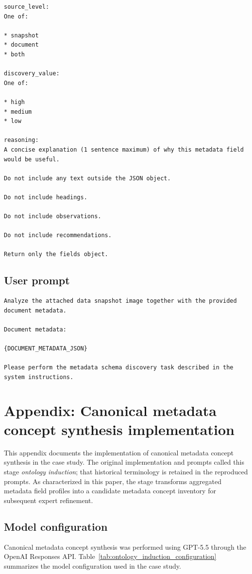 \documentclass{article}
\begin{document}
\begin{lstlisting}
source_level:
One of:

* snapshot
* document
* both

discovery_value:
One of:

* high
* medium
* low

reasoning:
A concise explanation (1 sentence maximum) of why this metadata field would be useful.

Do not include any text outside the JSON object.

Do not include headings.

Do not include observations.

Do not include recommendations.

Return only the fields object.

\end{lstlisting}

\subsection{User prompt}

\begin{lstlisting}
Analyze the attached data snapshot image together with the provided document metadata.

Document metadata:

{DOCUMENT_METADATA_JSON}

Please perform the metadata schema discovery task described in the system instructions.
\end{lstlisting}

\section{Appendix: Canonical metadata concept synthesis implementation}
\label{appendix:ontology_induction}

This appendix documents the implementation of canonical metadata concept synthesis in the case study. The original implementation and prompts called this stage \emph{ontology induction}; that historical terminology is retained in the reproduced prompts. As characterized in this paper, the stage transforms aggregated metadata field profiles into a candidate metadata concept inventory for subsequent expert refinement.

\subsection{Model configuration}

Canonical metadata concept synthesis was performed using GPT-5.5 through the OpenAI Responses API. Table~\ref{tab:ontology_induction_configuration} summarizes the model configuration used in the case study.
\end{document}
